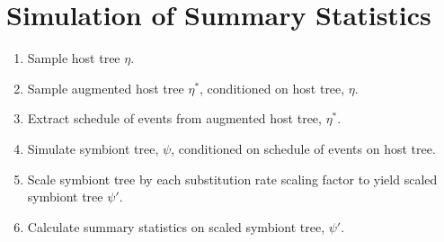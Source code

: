 \documentclass[11pt]{article}
\newcommand{\hostTree}{\eta}
\newcommand{\augmentedHostTree}{\hostTree^{*}}
\newcommand{\symbiontTree}{\psi}
\newcommand{\scaledSymbiontTree}{\psi\prime}
\begin{document}
\section{Simulation of Summary Statistics}
\label{simulation-workflow} %

\begin{enumerate}
    \item Sample host tree $\hostTree$.
    \item Sample augmented host tree $\augmentedHostTree$, conditioned on host tree, $\hostTree$.
    \item Extract schedule of events from augmented host tree, $\augmentedHostTree$.
    \item Simulate symbiont tree, $\symbiontTree$, conditioned on schedule of events on host tree.
    \item Scale symbiont tree by each substitution rate scaling factor to yield scaled symbiont tree $\scaledSymbiontTree$.
    \item Calculate summary statistics on scaled symbiont tree, $\scaledSymbiontTree$.
\end{enumerate}
\end{document}
